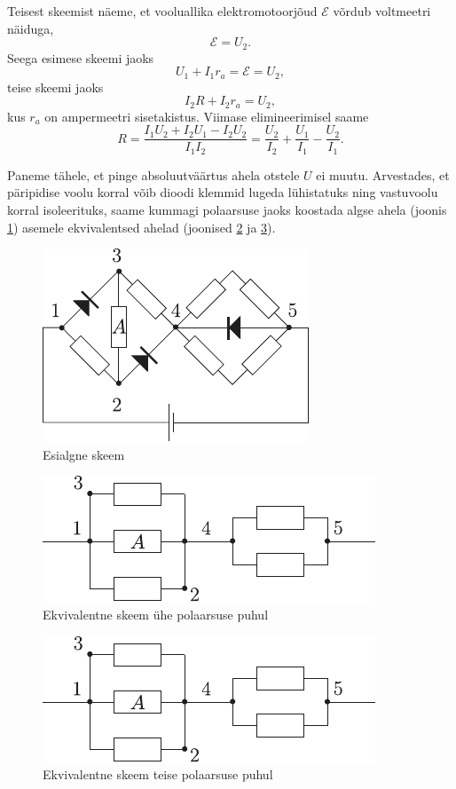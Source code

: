 \documentclass[10pt, twoside]{article}
\begin{document}
{
\solu
Teisest skeemist näeme, et vooluallika elektromotoorjõud $\mathcal E$ võrdub voltmeetri näiduga,
\[
\mathcal E = U_2.
\]
Seega esimese skeemi jaoks
\[
U_1 + I_1r_a = \mathcal E = U_2,
\]
teise skeemi jaoks
\[
I_2R + I_2r_a = U_2,
\]
kus $r_a$ on ampermeetri sisetakistus. Viimase elimineerimisel saame
\[
R=\frac{I_{1} U_{2}+I_{2} U_{1}-I_{2} U_{2}}{I_{1} I_{2}}=\frac{U_{2}}{I_{2}}+\frac{U_{1}}{I_{1}}-\frac{U_{2}}{I_{1}}.
\]
\probend
\bigskip


\solu
Paneme tähele, et pinge absoluutväärtus ahela otstele $U$ ei muutu. Arvestades, et päripidise voolu korral võib dioodi klemmid lugeda lühistatuks ning vastuvoolu korral isoleerituks, saame kummagi polaarsuse jaoks koostada algse ahela (joonis \ref{2005-v3g-04:fig1}) asemele ekvivalentsed ahelad (joonised \ref{2005-v3g-04:fig2} ja \ref{2005-v3g-04:fig3}).

\begin{figure}[h]
	\centering
	\includegraphics[width=0.6\linewidth]{2005-v3g-04-lah1}
	\caption{Esialgne skeem}
	\label{2005-v3g-04:fig1}
\end{figure}
\begin{figure}[h]
	\centering
	\includegraphics[width=0.6\linewidth]{2005-v3g-04-lah2}
	\caption{Ekvivalentne skeem ühe polaarsuse puhul}
	\label{2005-v3g-04:fig2}
\end{figure}
\begin{figure}[h]
	\centering
	\includegraphics[width=0.6\linewidth]{2005-v3g-04-lah2}
	\caption{ Ekvivalentne skeem teise polaarsuse puhul}
	\label{2005-v3g-04:fig3}
\end{figure}

}
\end{document}
